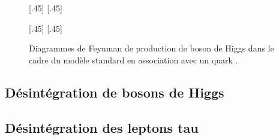 \begin{figure}[h]
\centering
\vspace{\baselineskip}
\subcaptionbox{\label{subfig-fgraph-Higgs_with_b_gg_g_bbh}}[.45\textwidth]
{\vspace{\baselineskip}}
\qquad
\subcaptionbox{\label{subfig-fgraph-Higgs_with_b_qq_g_bbh}}[.45\textwidth]
{\vspace{\baselineskip}}

\vspace{\baselineskip}
\subcaptionbox{\label{subfig-fgraph-Higgs_with_b_gg_hbb}}[.45\textwidth]
{\vspace{\baselineskip}}
\qquad
\subcaptionbox{\label{subfig-fgraph-Higgs_with_b_bg_b_bh}}[.45\textwidth]
{\vspace{\baselineskip}}

\caption{Diagrammes de Feynman de production de boson de Higgs dans le cadre du modèle standard en association avec un quark \quarkb.}
\label{fig-fgraph-Higgs_prod_with_b}
\end{figure}










\subsection{Désintégration de bosons de Higgs}



\subsection{Désintégration des leptons tau}











